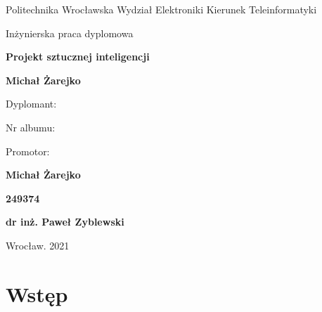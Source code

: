 \documentclass[12pt,oneside,a4paper]{report}
\begin{document}
\begin{titlepage}
   \begin{center}
        \vspace*{2cm}

        \large Politechnika Wrocławska Wydział Elektroniki Kierunek Teleinformatyki
        \vspace*{2cm}

        \large Inżynierska praca dyplomowa

        \vspace*{0.5cm}
        \huge\textbf{Projekt sztucznej inteligencji}

        \vspace{0.5cm}
        \normalsize 
            
        \textbf{Michał Żarejko}
        \vspace{3cm}

   \end{center}

        \setlength{\columnsep}{-20pt}
        \begin{multicols}{2}
           Dyplomant:  

           \vspace{0.2cm}
           Nr albumu:

           \vspace{0.2cm}
           Promotor:

        \columnbreak
           \textbf{Michał Żarejko}

           \vspace{0.2cm}
            \textbf{249374}

           \vspace{0.2cm}
            \textbf{dr inż. Paweł Zyblewski}
        \end{multicols}

        \vspace{0.5cm}


        \vspace{2cm}
   \begin{center}
        Wrocław. 2021


   \end{center}
\end{titlepage}


\tableofcontents{}
\newpage

\setlength{\parindent}{1.5em}
\setlength{\parskip}{1em}
\renewcommand{\baselinestretch}{2.0}

\chapter{Wstęp}
\end{document}
